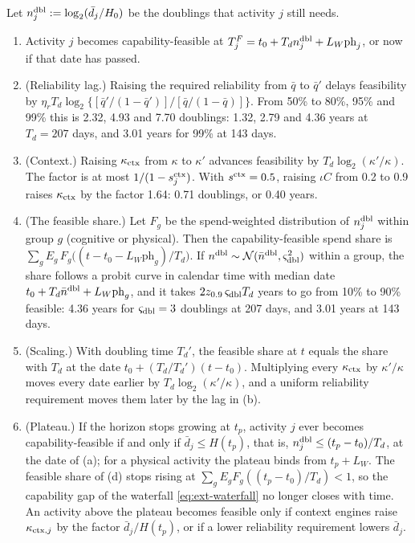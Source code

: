 \begin{proposition}\label{prop:ext-feasible}
Let $n^{\rm dbl}_j:=\log_2(\bar d_j/H_0)$ be the doublings that activity $j$ still needs.
\begin{enumerate}
\item[(a)] Activity $j$ becomes capability-feasible at $T^F_j=t_0+T_dn^{\rm dbl}_j+L_W\mathrm{ph}_j$, or now if that date has passed.
\item[(b)] (Reliability lag.) Raising the required reliability from $\bar q$ to $\bar q'$ delays feasibility by $\eta_rT_d\log_2\{[\bar q'/(1-\bar q')]/[\bar q/(1-\bar q)]\}$. From 50\% to 80\%, 95\% and 99\% this is 2.32, 4.93 and 7.70 doublings: 1.32, 2.79 and 4.36 years at $T_d=207$ days, and 3.01 years for 99\% at 143 days.
\item[(c)] (Context.) Raising $\kappa_{\rm ctx}$ from $\kappa$ to $\kappa'$ advances feasibility by $T_d\log_2(\kappa'/\kappa)$. The factor is at most $1/(1-s^{\rm ctx}_j)$. With $s^{\rm ctx}=0.5$, raising $\iota C$ from 0.2 to 0.9 raises $\kappa_{\rm ctx}$ by the factor 1.64: 0.71 doublings, or 0.40 years.
\item[(d)] (The feasible share.) Let $F_g$ be the spend-weighted distribution of $n^{\rm dbl}_j$ within group $g$ (cognitive or physical). Then the capability-feasible spend share is $\sum_gE_g\,F_g\bigl((t-t_0-L_W\mathrm{ph}_g)/T_d\bigr)$. If $n^{\rm dbl}\sim\mathcal N(\bar n^{\rm dbl},\varsigma_{\rm dbl}^2)$ within a group, the share follows a probit curve in calendar time with median date $t_0+T_d\bar n^{\rm dbl}+L_W\mathrm{ph}_g$, and it takes $2z_{0.9}\,\varsigma_{\rm dbl}T_d$ years to go from 10\% to 90\% feasible: 4.36 years for $\varsigma_{\rm dbl}=3$ doublings at 207 days, and 3.01 years at 143 days.
\item[(e)] (Scaling.) With doubling time $T_d'$, the feasible share at $t$ equals the share with $T_d$ at the date $t_0+(T_d/T_d')(t-t_0)$. Multiplying every $\kappa_{\rm ctx}$ by $\kappa'/\kappa$ moves every date earlier by $T_d\log_2(\kappa'/\kappa)$, and a uniform reliability requirement moves them later by the lag in (b).
\item[(f)] (Plateau.) If the horizon stops growing at $t_p$, activity $j$ ever becomes capability-feasible if and only if $\bar d_j\le H(t_p)$, that is, $n^{\rm dbl}_j\le(t_p-t_0)/T_d$, at the date of (a); for a physical activity the plateau binds from $t_p+L_W$. The feasible share of (d) stops rising at $\sum_gE_gF_g((t_p-t_0)/T_d)<1$, so the capability gap of the waterfall \eqref{eq:ext-waterfall} no longer closes with time. An activity above the plateau becomes feasible only if context engines raise $\kappa_{{\rm ctx},j}$ by the factor $\bar d_j/H(t_p)$, or if a lower reliability requirement lowers $\bar d_j$.
\end{enumerate}
\end{proposition}

